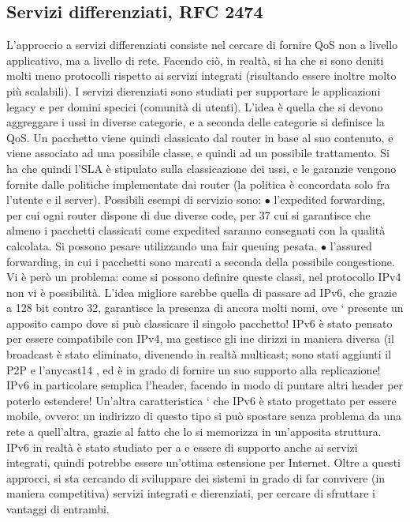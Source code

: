 \subsection{Servizi differenziati, RFC 2474}
L'approccio a servizi differenziati consiste nel cercare di fornire QoS non a livello
applicativo, ma a livello di rete. Facendo ciò, in realtà, si ha che si sono deniti
molti meno protocolli rispetto ai servizi integrati (risultando essere inoltre molto
più scalabili). I servizi dierenziati sono studiati per supportare le applicazioni
legacy e per domini specici (comunità di utenti). L'idea è quella che si devono
aggreggare i ussi in diverse categorie, e a seconda delle categorie si definisce la
QoS. Un pacchetto viene quindi classicato dal router in base al suo contenuto,
e viene associato ad una possibile classe, e quindi ad un possibile trattamento.
Si ha che quindi l'SLA è stipulato sulla classicazione dei ussi, e le garanzie
vengono fornite dalle politiche implementate dai router (la politica è concordata
solo fra l'utente e il server).
Possibili esempi di servizio sono:
$\bullet$ l'expedited forwarding, per cui ogni router dispone di due diverse code, per
37
cui si garantisce che almeno i pacchetti classicati come expedited saranno
consegnati con la qualità calcolata. Si possono pesare utilizzando una fair
queuing pesata.
$\bullet$ l'assured forwarding, in cui i pacchetti sono marcati a seconda della possibile congestione.
Vi è però un problema: come si possono definire queste classi, nel protocollo
IPv4 non vi è possibilità. L'idea migliore sarebbe quella di passare ad IPv6, che
grazie a 128 bit contro 32, garantisce la presenza di ancora molti nomi, ove `
presente un apposito campo dove si può classicare il singolo pacchetto!
IPv6 è stato pensato per essere compatibile con IPv4, ma gestisce gli ine
dirizzi in maniera diversa (il broadcast è stato eliminato, divenendo in realtà
multicast; sono stati aggiunti il P2P e l'anycast14 , ed è in grado di fornire un
suo supporto alla replicazione! IPv6 in particolare semplica l'header, facendo
in modo di puntare altri header per poterlo estendere! Un'altra caratteristica
` che IPv6 è stato progettato per essere mobile, ovvero: un indirizzo di questo
tipo si può spostare senza problema da una rete a quell'altra, grazie al fatto che
lo si memorizza in un'apposita struttura. IPv6 in realtà è stato studiato per
a e
essere di supporto anche ai servizi integrati, quindi potrebbe essere un'ottima
estensione per Internet.
Oltre a questi approcci, si sta cercando di sviluppare dei sistemi in grado
di far convivere (in maniera competitiva) servizi integrati e dierenziati, per
cercare di sfruttare i vantaggi di entrambi.
